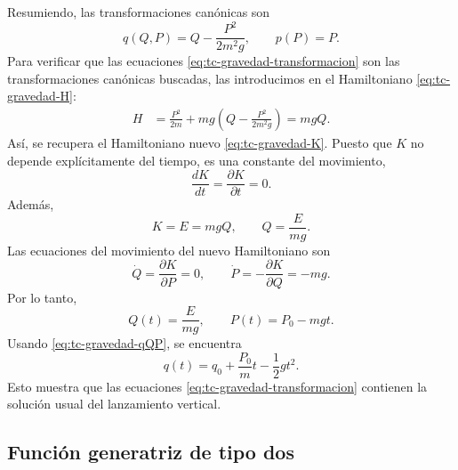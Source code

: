 \documentclass[../apunte_mecanica_clasica.tex]{subfiles}
\begin{document}
Resumiendo, las transformaciones canónicas son
\begin{equation}
    q(Q,P)=Q-\frac{P^2}{2m^2g},
    \qquad
    p(P)=P.
    \label{eq:tc-gravedad-transformacion}
\end{equation}
Para verificar que las ecuaciones \eqref{eq:tc-gravedad-transformacion} son las transformaciones canónicas buscadas, las introducimos en el Hamiltoniano \eqref{eq:tc-gravedad-H}:
\begin{align}
    H&=\frac{P^2}{2m}+mg\left(Q-\frac{P^2}{2m^2g}\right)
      =mgQ.
    \label{eq:tc-gravedad-HK}
\end{align}
Así, se recupera el Hamiltoniano nuevo \eqref{eq:tc-gravedad-K}. Puesto que \(K\) no depende explícitamente del tiempo, es una constante del movimiento,
\begin{equation}
    \frac{dK}{dt}=\frac{\partial K}{\partial t}=0.
    \label{eq:tc-gravedad-K-conservado}
\end{equation}
Además,
\begin{equation}
    K=E=mgQ,
    \qquad
    Q=\frac{E}{mg}.
    \label{eq:tc-gravedad-Q-energia}
\end{equation}
Las ecuaciones del movimiento del nuevo Hamiltoniano son
\begin{equation}
    \dot Q=\frac{\partial K}{\partial P}=0,
    \qquad
    \dot P=-\frac{\partial K}{\partial Q}=-mg.
    \label{eq:tc-gravedad-eqmov}
\end{equation}
Por lo tanto,
\begin{equation}
    Q(t)=\frac{E}{mg},
    \qquad
    P(t)=P_0-mgt.
    \label{eq:tc-gravedad-QP-solucion}
\end{equation}
Usando \eqref{eq:tc-gravedad-qQP}, se encuentra
\begin{equation}
    q(t)=q_0+\frac{P_0}{m}t-\frac{1}{2}gt^2.
    \label{eq:tc-gravedad-q-solucion}
\end{equation}
Esto muestra que las ecuaciones \eqref{eq:tc-gravedad-transformacion} contienen la solución usual del lanzamiento vertical.

\subsection{Función generatriz de tipo dos}
\label{subsec:tc-F2}
\end{document}
